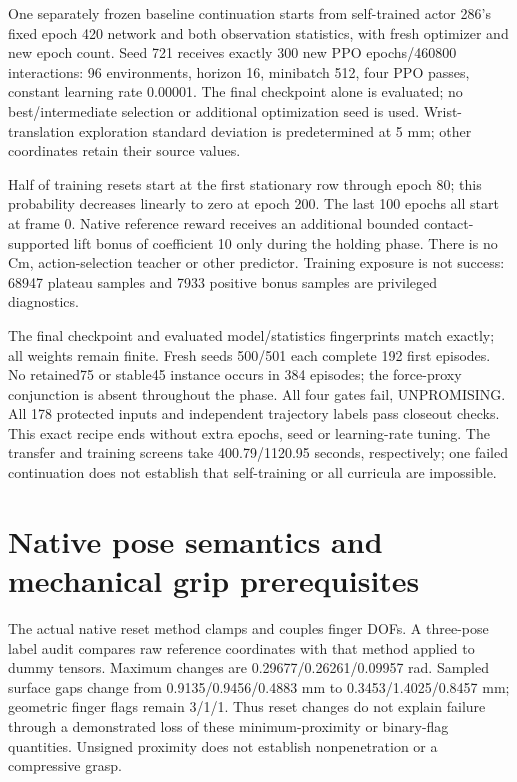 \documentclass[10 pt]{article}
\begin{document}
\begin{table}[h]
\centering

\caption{Synthetic plateau episodes. Transfer and continuation use different cohorts and actor configurations; these rows are separate feasibility screens, not a matched treatment comparison.}
\end{table}

One separately frozen baseline continuation starts from self-trained actor 286's
fixed epoch 420 network and both observation statistics, with fresh optimizer and
new epoch count. Seed 721 receives exactly 300 new PPO epochs/460800 interactions:
96 environments, horizon 16, minibatch 512, four PPO passes, constant learning rate
0.00001. The final checkpoint alone is evaluated; no best/intermediate selection
or additional optimization seed is used. Wrist-translation exploration standard
deviation is predetermined at 5 mm; other coordinates retain their source values.

Half of training resets start at the first stationary row through epoch 80; this
probability decreases linearly to zero at epoch 200. The last 100 epochs all start
at frame 0. Native reference reward receives an additional bounded contact-supported
lift bonus of coefficient 10 only during the holding phase. There is no Cm,
action-selection teacher or other predictor. Training exposure is not success:
68947 plateau samples and 7933 positive bonus samples are privileged diagnostics.

The final checkpoint and evaluated model/statistics fingerprints match exactly;
all weights remain finite. Fresh seeds 500/501 each complete 192 first episodes.
No retained75 or stable45 instance occurs in 384 episodes; the force-proxy conjunction
is absent throughout the phase. All four gates fail, UNPROMISING. All 178 protected
inputs and independent trajectory labels pass closeout checks. This exact recipe
ends without extra epochs, seed or learning-rate tuning. The transfer and training
screens take 400.79/1120.95 seconds, respectively; one failed continuation does not
establish that self-training or all curricula are impossible.

\section{Native pose semantics and mechanical grip prerequisites}
The actual native reset method clamps and couples finger DOFs. A three-pose label
audit compares raw reference coordinates with that method applied to dummy tensors.
Maximum changes are 0.29677/0.26261/0.09957 rad. Sampled surface gaps change from
0.9135/0.9456/0.4883 mm to 0.3453/1.4025/0.8457 mm; geometric finger flags remain 3/1/1.
Thus reset changes do not explain failure through a demonstrated loss of these
minimum-proximity or binary-flag quantities. Unsigned proximity does not establish
nonpenetration or a compressive grasp.
\end{document}
